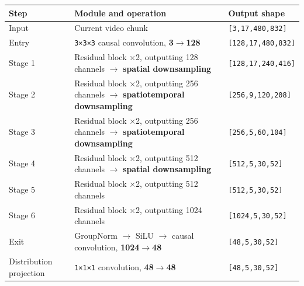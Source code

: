\documentclass[
  11pt,
  a4paper,
]{article}
\newcounter{none} %
\begin{document}
{\def\LTcaptype{none} %
\begin{longtable}[]{@{}
  >{\raggedright\arraybackslash}p{}
  >{\raggedright\arraybackslash}p{}
  >{\raggedright\arraybackslash}p{}@{}}
\toprule\noalign{}
\begin{minipage}[b]{\linewidth}\raggedright
Step
\end{minipage} & \begin{minipage}[b]{\linewidth}\raggedright
Module and operation
\end{minipage} & \begin{minipage}[b]{\linewidth}\raggedright
Output shape
\end{minipage} \\
\midrule\noalign{}
\endhead
\bottomrule\noalign{}
\endlastfoot
Input & Current video chunk & \texttt{{[}3,17,480,832{]}} \\
Entry & \texttt{3×3×3} causal convolution, \textbf{3\(\rightarrow\)128}
& \texttt{{[}128,17,480,832{]}} \\
Stage 1 & Residual block ×2, outputting 128 channels \(\rightarrow\)
\textbf{spatial downsampling} & \texttt{{[}128,17,240,416{]}} \\
Stage 2 & Residual block ×2, outputting 256 channels \(\rightarrow\)
\textbf{spatiotemporal downsampling} & \texttt{{[}256,9,120,208{]}} \\
Stage 3 & Residual block ×2, outputting 256 channels \(\rightarrow\)
\textbf{spatiotemporal downsampling} & \texttt{{[}256,5,60,104{]}} \\
Stage 4 & Residual block ×2, outputting 512 channels \(\rightarrow\)
\textbf{spatial downsampling} & \texttt{{[}512,5,30,52{]}} \\
Stage 5 & Residual block ×2, outputting 512 channels &
\texttt{{[}512,5,30,52{]}} \\
Stage 6 & Residual block ×2, outputting 1024 channels &
\texttt{{[}1024,5,30,52{]}} \\
Exit & GroupNorm \(\rightarrow\) SiLU \(\rightarrow\) causal
convolution, \textbf{1024\(\rightarrow\)48} &
\texttt{{[}48,5,30,52{]}} \\
Distribution projection & \texttt{1×1×1} convolution,
\textbf{48\(\rightarrow\)48} & \texttt{{[}48,5,30,52{]}} \\
\end{longtable}
}

\endgroup
\end{document}
